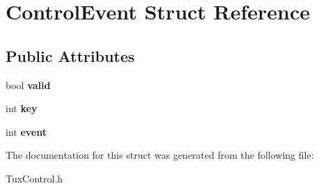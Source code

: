 \hypertarget{structControlEvent}{
\section{ControlEvent Struct Reference}
\label{structControlEvent}
}
\subsection*{Public Attributes}
\begin{DoxyCompactItemize}
\item 
\hypertarget{structControlEvent_ad1bb35f9b1f6a0989d49197c03b1d8cf}{
bool {\bfseries valid}}
\label{structControlEvent_ad1bb35f9b1f6a0989d49197c03b1d8cf}

\item 
\hypertarget{structControlEvent_a20f38d8c68ed16eea0f7786a69257f7f}{
int {\bfseries key}}
\label{structControlEvent_a20f38d8c68ed16eea0f7786a69257f7f}

\item 
\hypertarget{structControlEvent_af33fc326e46a2183ae73c0e2cf4b55ac}{
int {\bfseries event}}
\label{structControlEvent_af33fc326e46a2183ae73c0e2cf4b55ac}

\end{DoxyCompactItemize}


The documentation for this struct was generated from the following file:\begin{DoxyCompactItemize}
\item 
TuxControl.h\end{DoxyCompactItemize}
